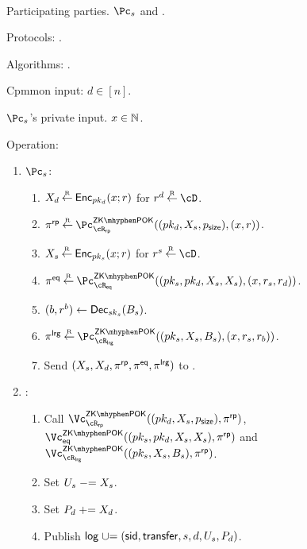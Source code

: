 \begin{protocol}~\label{prot:ConfidentialTransactions:Transfer}
	\item[Participating parties.] $\Pc_s$ and \Cc.
	
\item[Protocols:]   \piZKPOK{\rRP}. 


\item[Algorithms:]    \Dec.

	
	\item[Cpmmon input:] $d\in [n]$.
	
	\item[$\Pc_s$'s private  input.] $x \in {\mathbb{N}}$.
	
	\item Operation: 
	
	\begin{enumerate}
		\item  $\Pc_s$: 
		
		\begin{enumerate}
			\item $X_d \mathbin{\stackrel{\mbox{\tiny R}}{\leftarrow}} \mathsf{Enc}_{pk_d}(x;r)$ for $r^d \getsr \cD$.
			
		
			\item $\pi^\RPs \getsr \pZKPOK{\rRP}((pk_d,X_s,\psize),(x,r))$.
			
			
			\item $X_s \mathbin{\stackrel{\mbox{\tiny R}}{\leftarrow}} \mathsf{Enc}_{pk_s}(x;r)$ for $r^s \getsr \cD$.
			
			
			
			\item $\pi^\Eqs \getsr \pZKPOK{\rEQ}((pk_s,pk_d,X_s,X_s),(x,r_s,r_d))$.
			
			
			\item $(b,r^b) \leftarrow \mathsf{Dec}_{sk_s}(B_s)$.
			
			
			\item $\pi^\Lrgs \getsr \pZKPOK{\rLrg}((pk_s,X_s,B_s),(x,r_s,r_b))$.
			
			
			\item Send $(X_s,X_d,\pi^{\sf rp},\pi^{\sf eq},\pi^{\sf lrg})$ to \Cc.
		\end{enumerate}
		
		
		\item  \Cc: 
		
		\begin{enumerate}
			\item  Call $\vZKPOK{\rRP}((pk_d,X_s,\psize),\pi^\RPs)$, $\vZKPOK{\Eqs}((pk_s,pk_d,X_s,X_s),\pi^\RPs)$ and $\vZKPOK{\rLrg}((pk_s,X_s,B_s),\pi^\RPs)$.
			
		
		     \item  Set $U_s \mathrel{-}= X_s$. 
              
              \item  Set $P_d \mathrel{+}= X_d$. 
              
              		     
		     \item Publish  $\mathsf{log} \mathrel{\cup}= (\mathsf{sid},\mathsf{transfer},s,d,U_s,P_d)$.
		     
		\end{enumerate}
		
	\end{enumerate}
	
\end{protocol}
